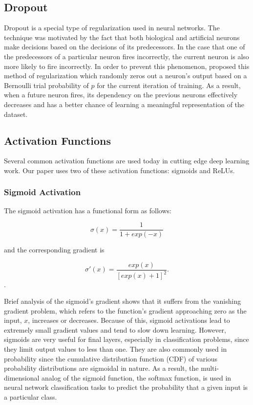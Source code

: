\subsection{Dropout}
Dropout is a special type of regularization used in neural networks. The technique was motivated by the fact that both biological and artificial neurons make decisions based on the decisions of its predecessors. In the case that one of the predecessors of a particular neuron fires incorrectly, the current neuron is also more likely to fire incorrectly. In order to prevent this phenomenon, \citet{dropout} proposed this method of regularization which randomly zeros out a neuron's output based on a Bernoulli trial probability of $p$ for the current iteration of training. As a result, when a future neuron fires, its dependency on the previous neurons effectively decreases and has a better chance of learning a meaningful representation of the dataset. 


\subsection{Activation Functions}
\label{activationfunctions}

Several common activation functions are used today in cutting edge deep learning work. Our paper uses two of these activation functions: sigmoids and ReLUs. 
\subsubsection*{Sigmoid Activation}

The sigmoid activation has a functional form as follows: 

\begin{equation}
	\sigma(x) = \frac{1}{1 + exp(-x)}
\end{equation}

\noindent
and the corresponding gradient is 

\begin{equation}
	\sigma ' (x)  = \frac{exp(x)}{[exp(x) + 1]^2}.
\end{equation}. 

Brief analysis of the sigmoid's gradient shows that it suffers from the vanishing gradient problem, which refers to the function's gradient approaching zero as the input, $x$, increases or decreases. Because of this, sigmoid activations lead to extremely small gradient values and tend to slow down learning. However, sigmoids are very useful for final layers, especially in classification problems, since they limit output values to less than one. They are also commonly used in probability since the cumulative distribution function (CDF) of various probability distributions are sigmoidal in nature. As a result, the multi-dimensional analog of the sigmoid function, the softmax function, is used in neural network classification tasks to predict the probability that a given input is a particular class. 

